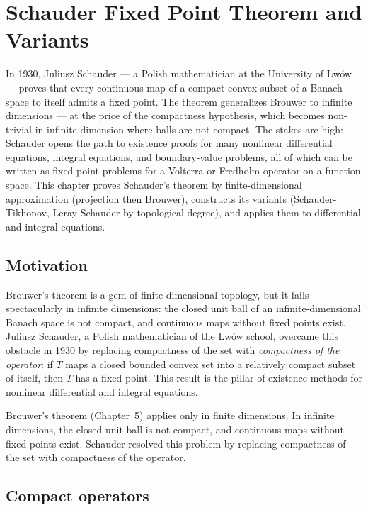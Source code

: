 \chapter{Schauder Fixed Point Theorem and Variants}\label{ch:schauder}

In 1930, Juliusz Schauder --- a Polish mathematician at the University of Lwów --- proves that every continuous map of a compact convex subset of a Banach space to itself admits a fixed point. The theorem generalizes Brouwer to infinite dimensions --- at the price of the compactness hypothesis, which becomes non-trivial in infinite dimension where balls are not compact. The stakes are high: Schauder opens the path to existence proofs for many nonlinear differential equations, integral equations, and boundary-value problems, all of which can be written as fixed-point problems for a Volterra or Fredholm operator on a function space. This chapter proves Schauder's theorem by finite-dimensional approximation (projection then Brouwer), constructs its variants (Schauder-Tikhonov, Leray-Schauder by topological degree), and applies them to differential and integral equations.

\section{Motivation}

Brouwer's theorem is a gem of finite-dimensional topology, but it fails spectacularly in infinite dimensions: the closed unit ball of an infinite-dimensional Banach space is not compact, and continuous maps without fixed points exist. Juliusz Schauder, a Polish mathematician of the Lw\'ow school, overcame this obstacle in 1930 by replacing compactness of the set with \emph{compactness of the operator}: if $T$ maps a closed bounded convex set into a relatively compact subset of itself, then $T$ has a fixed point. This result is the pillar of existence methods for nonlinear differential and integral equations.

Brouwer's theorem (Chapter~5) applies only in finite dimensions. In infinite
dimensions, the closed unit ball is not compact, and continuous maps without
fixed points exist. Schauder resolved this problem by replacing compactness of
the set with compactness of the operator.

\section{Compact operators}

